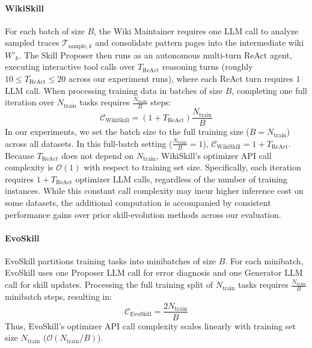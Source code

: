 \documentclass[11pt, a4paper, copyright, gr]{google}
\newcommand{\method}{WikiSkill\xspace}
\begin{document}
\paragraph{WikiSkill}
For each batch of size $B$, the Wiki Maintainer requires one LLM call to analyze sampled traces $\mathcal{T}_{\text{sample}, k}$ and consolidate pattern pages into the intermediate wiki $W'_k$. The Skill Proposer then runs as an autonomous multi-turn ReAct agent, executing interactive tool calls over $T_{\text{ReAct}}$ reasoning turns (roughly $10 \le T_{\text{ReAct}} \le 20$ across our experiment runs), where each ReAct turn requires $1$ LLM call. When processing training data in batches of size $B$, completing one full iteration over $N_{\text{train}}$ tasks requires $\frac{N_{\text{train}}}{B}$ steps:
\begin{equation}
\mathcal{C}_{\text{WikiSkill}} = (1 + T_{\text{ReAct}}) \frac{N_{\text{train}}}{B}
\end{equation}
In our experiments, we set the batch size to the full training size ($B = N_{\text{train}}$) across all datasets. In this full-batch setting ($\frac{N_{\text{train}}}{B} = 1$), $\mathcal{C}_{\text{WikiSkill}} = 1 + T_{\text{ReAct}}$. Because $T_{\text{ReAct}}$ does not depend on $N_{\text{train}}$, \method's optimizer API call complexity is $\mathcal{O}(1)$ with respect to training set size. Specifically, each iteration requires $1 + T_{\text{ReAct}}$ optimizer LLM calls, regardless of the number of training instances. While this constant call complexity may incur higher inference cost on some datasets, the additional computation is accompanied by consistent performance gains over prior skill-evolution methods across our evaluation.

\paragraph{EvoSkill}
EvoSkill partitions training tasks into minibatches of size $B$. For each minibatch, EvoSkill uses one Proposer LLM call for error diagnosis and one Generator LLM call for skill updates. Processing the full training split of $N_{\text{train}}$ tasks requires $\frac{N_{\text{train}}}{B}$ minibatch steps, resulting in:
\begin{equation}
\mathcal{C}_{\text{EvoSkill}} = \frac{2 N_{\text{train}}}{B}
\end{equation}
Thus, EvoSkill's optimizer API call complexity scales linearly with training set size $N_{\text{train}}$ ($\mathcal{O}(N_{\text{train}}/B)$).
\end{document}
